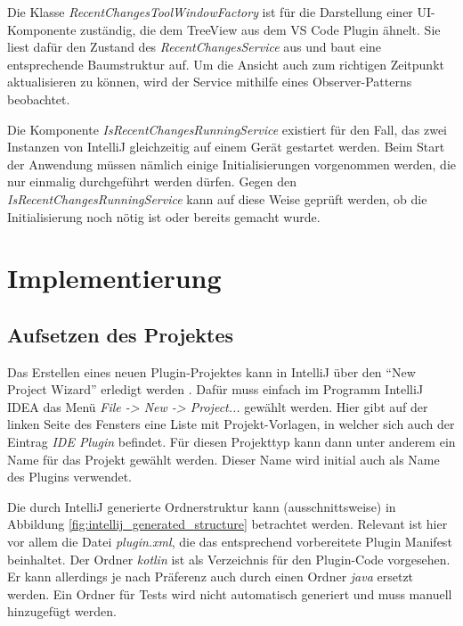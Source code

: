 Die Klasse \emph{RecentChangesToolWindowFactory} ist für die Darstellung
einer \linebreak
UI-Komponente zuständig, die dem TreeView aus dem VS Code Plugin
ähnelt. Sie liest dafür den Zustand des \emph{RecentChangesService} aus
und baut eine entsprechende Baumstruktur auf. Um die Ansicht auch zum richtigen
Zeitpunkt aktualisieren zu können, wird der Service mithilfe eines
Observer-Patterns \cite{2005Dp:e} beobachtet.

Die Komponente \emph{IsRecentChangesRunningService} existiert für den Fall,
das zwei Instanzen von IntelliJ gleichzeitig auf einem Gerät gestartet werden.
Beim Start der Anwendung müssen nämlich einige Initialisierungen vorgenommen
werden, die nur einmalig durchgeführt werden dürfen. Gegen den
\emph{IsRecentChangesRunningService} kann auf diese Weise geprüft werden, ob
die Initialisierung noch nötig ist oder bereits gemacht wurde.


\section{Implementierung}
\label{sec:EntwicklungIntelliJ_Implementierung}

\subsection{Aufsetzen des Projektes}

Das Erstellen eines neuen Plugin-Projektes kann in IntelliJ über den 
\enquote{New Project Wizard} erledigt werden
\cite{IntelliJPlatformSDKCreateProject}. Dafür muss einfach
im Programm IntelliJ IDEA das Menü \emph{File -> New -> Project...}
gewählt werden. Hier gibt auf der linken Seite des Fensters eine 
Liste mit Projekt-Vorlagen, in welcher sich auch der Eintrag 
\emph{IDE Plugin} befindet. Für diesen Projekttyp kann dann unter anderem
ein Name für das Projekt gewählt werden. Dieser Name wird initial auch als
Name des Plugins verwendet.

Die durch IntelliJ generierte Ordnerstruktur kann (ausschnittsweise) in 
Abbildung \ref{fig:intellij_generated_structure} betrachtet werden.
Relevant ist hier vor allem die Datei \emph{plugin.xml}, die das 
ent\-sprechend vorbereitete Plugin Manifest beinhaltet. Der Ordner
\emph{kotlin} ist als Verzeichnis für den Plugin-Code vorgesehen.
Er kann allerdings je nach Präferenz auch durch einen Ordner \emph{java}
ersetzt werden. Ein Ordner für Tests wird nicht automatisch generiert
und muss manuell hinzugefügt werden.

